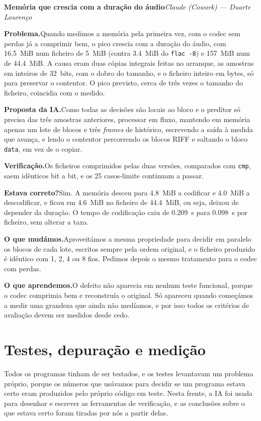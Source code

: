 \documentclass[a4paper,11pt]{article}
\newcommand{\prog}[1]{\texttt{#1}}
\newcommand{\caso}[3]{%
  \par\medskip\noindent\textbf{#1}\hfill{\small\textit{#2 --- #3}}\par\nopagebreak\smallskip}
\newcommand{\campo}[2]{\noindent\textbf{#1}\enspace #2\par}
\newcommand{\problema}[1]{\campo{Problema.}{#1}}
\newcommand{\proposta}[1]{\campo{Proposta da IA.}{#1}}
\newcommand{\verificacao}[1]{\campo{Verificação.}{#1}}
\newcommand{\correto}[1]{\campo{Estava correto?}{#1}}
\newcommand{\alteracoes}[1]{\campo{O que mudámos.}{#1}}
\newcommand{\aprendizagem}[1]{\campo{O que aprendemos.}{#1}}
\begin{document}
\caso{Memória que crescia com a duração do áudio}{Claude (Cowork)}{Duarte Lourenço}
\problema{Quando medimos a memória pela primeira vez, com o codec sem perdas já
a comprimir bem, o pico crescia com a duração do áudio, com \SI{16,5}{MiB} num
ficheiro de \SI{5}{MiB} (contra \SI{3,4}{MiB} do \prog{flac -8}) e
\SI{157}{MiB} num de \SI{44,4}{MiB}. A causa eram duas cópias integrais feitas
no arranque, as amostras em inteiros de 32~bits, com o dobro do tamanho, e o
ficheiro inteiro em bytes, só para preservar o contentor. O pico previsto, cerca
de três vezes o tamanho do ficheiro, coincidia com o medido.}
\proposta{Como todas as decisões são locais ao bloco e o preditor só precisa
das três amostras anteriores, processar em fluxo, mantendo em memória apenas um
lote de blocos e três \emph{frames} de histórico, escrevendo a saída à medida
que avança, e lendo o contentor percorrendo os blocos RIFF e saltando o bloco
\texttt{data}, em vez de o copiar.}
\verificacao{Os ficheiros comprimidos pelas duas versões, comparados com
\prog{cmp}, saem idênticos bit a bit, e os 25 casos-limite continuam a passar.}
\correto{Sim. A memória desceu para \SI{4,8}{MiB} a codificar e
\SI{4,0}{MiB} a descodificar, e ficou em \SI{4,6}{MiB} no ficheiro de
\SI{44,4}{MiB}, ou seja, deixou de depender da duração. O tempo de codificação
caiu de \SI{0,209}{s} para \SI{0,098}{s} por ficheiro, sem alterar a taxa.}
\alteracoes{Aproveitámos a mesma propriedade para decidir em paralelo os blocos
de cada lote, escritos sempre pela ordem original, e o ficheiro produzido é
idêntico com 1, 2, 4 ou 8 fios. Pedimos depois o mesmo tratamento para o codec
com perdas.}
\aprendizagem{O defeito não aparecia em nenhum teste funcional, porque o codec
comprimia bem e reconstruía o original. Só apareceu quando começámos a medir
uma grandeza que ainda não medíamos, e por isso todos os critérios de avaliação
devem ser medidos desde cedo.}

\section{Testes, depuração e medição}
\label{sec:testes}
Todos os programas tinham de ser testados, e os testes levantavam um problema
próprio, porque os números que usávamos para decidir se um programa estava certo
eram produzidos pelo próprio código em teste. Nesta frente, a IA foi usada para
desenhar e escrever as ferramentas de verificação, e as conclusões sobre o que
estava certo foram tiradas por nós a partir delas.
\end{document}
